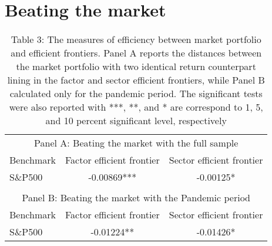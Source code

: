 \documentclass{article}
\begin{document}
\section{Beating the market}

\begin{table}[h]
  \centering
  \caption{Table 3: The measures of efficiency between market portfolio and efficient frontiers. Panel A reports the distances between the market portfolio with two identical return counterpart lining in the factor and sector efficient frontiers, while Panel B calculated only for the pandemic period. The significant tests were also reported with ***, **, and * are correspond to 1, 5, and 10 percent significant level, respectively}
  
    \begin{tabular}{lcc}
          &       &  \\
    \midrule
    \multicolumn{3}{c}{Panel A: Beating the market with the full sample} \\
    \midrule
    \midrule
    Benchmark & \multicolumn{1}{c}{Factor efficient frontier} & \multicolumn{1}{l}{Sector efficient frontier} \\
    S\&P500 & -0.00869*** & -0.00125* \\
          &       &  \\
    \midrule
    \multicolumn{3}{c}{Panel B: Beating the market with the Pandemic period} \\
    \midrule
    \midrule
    Benchmark & \multicolumn{1}{c}{Factor efficient frontier} & \multicolumn{1}{l}{Sector efficient frontier} \\
    S\&P500 & -0.01224** & -0.01426* \\
    \end{tabular}%


\end{table}%
\end{document}
